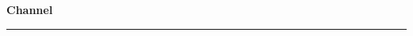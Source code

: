 % 
% 
% 
% 
% 
%
\cleardoublepage
\begin{figure*}[h!]
  \centering
  \hfill
  {\Huge {\bf Channel \channel\ \channelCharacteristics}}
  \hfill
\end{figure*}
\hrule

